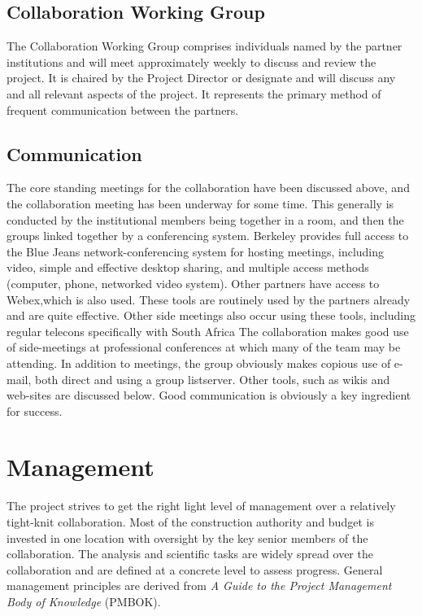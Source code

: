 \documentclass[preprint]{aastex}
\begin{document}
\subsection{Collaboration Working Group}
The Collaboration Working Group comprises individuals named by the partner
institutions and will meet approximately weekly to discuss and review the project. It is chaired
by the Project Director or designate and will discuss any and all relevant aspects of
the project. It represents the primary method of frequent communication between the
partners.


\subsection{Communication}
The core standing meetings for the collaboration have been discussed above, and the
collaboration meeting has been underway for some time. This generally is
conducted by the institutional members being together in a room, and then the groups linked together by a
conferencing system. Berkeley provides full access to the Blue Jeans
network-conferencing system for hosting meetings, including video, simple and
effective desktop sharing, and multiple access methods (computer, phone, networked
video system). Other partners have access to Webex,which is also used. These tools
are routinely used by the partners already and are quite effective.
Other side meetings also occur using these tools, including regular telecons
specifically with South Africa The collaboration makes good use of side-meetings at
professional conferences at which many of the team may be attending.
In addition to meetings, the group obviously makes copious use of e-mail, both direct 
and using a group listserver.  Other tools, such as wikis and web-sites are discussed below.
Good communication is obviously a key ingredient for success.

\section{Management}
The project strives to get the right light level of management over a relatively tight-knit
collaboration.  Most of the construction authority and budget is invested in one location
with oversight by the key senior members of the collaboration.  The analysis and 
scientific tasks are widely spread over the collaboration and are defined at a 
concrete level to assess progress.  General management principles are derived from
{\it A Guide to the Project Management Body of Knowledge} (PMBOK).
\end{document}

